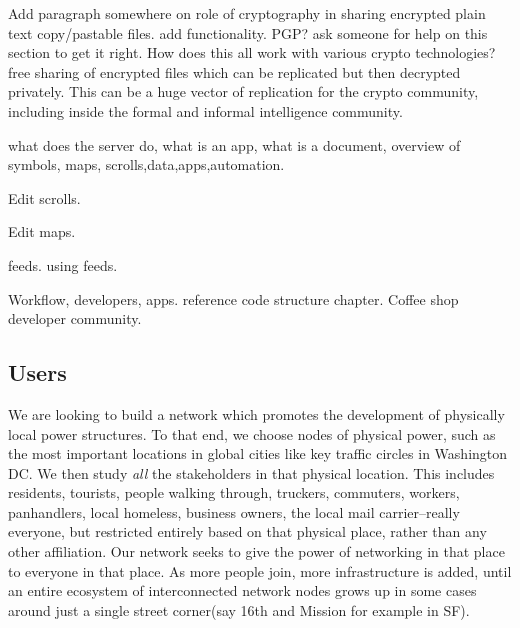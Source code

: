 Add paragraph somewhere on role of cryptography in sharing encrypted plain text copy/pastable files.  add functionality.  PGP?  ask someone for help on this section to get it right. How does this all work with various crypto technologies?  free sharing of encrypted files which can be replicated but then decrypted privately.  This can be a huge vector of replication for the crypto community, including inside the formal and informal intelligence community.  

what does the server do, what is an app, what is a document, overview of symbols, maps, scrolls,data,apps,automation.

Edit scrolls.

Edit maps.

feeds.  using feeds.

Workflow, developers, apps.  reference code structure chapter. Coffee shop developer community.


\subsection{Users}

We are looking to build a network which promotes the development of physically local power structures.  To that end, we choose nodes of physical power, such as the most important locations in global cities like key traffic circles in Washington DC.  We then study \emph{all} the stakeholders in that physical location. This includes residents, tourists, people walking through, truckers, commuters, workers, panhandlers, local homeless, business owners, the local mail carrier--really everyone, but restricted entirely based on that physical place, rather than any other affiliation.  Our network seeks to give the power of networking in that place to everyone in that place. As more people join, more infrastructure is added, until an entire ecosystem of interconnected network nodes grows up in some cases around just a single street corner(say 16th and Mission for example in SF).   

